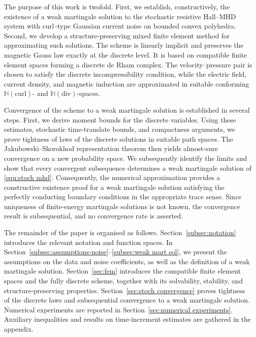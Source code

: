 \documentclass[11pt, reqno]{amsart}
\theoremstyle{definition}
\numberwithin{equation}{section}
\newcommand{\curl}{\mathrm{curl}\,}
\newcommand{\hdiv}{\mathbb{H}(\mathrm{div})}
\newcommand{\hcurl}{\mathbb{H}(\mathrm{curl})}
\begin{document}
The purpose of this work is twofold. First, we establish, constructively, the existence of a weak martingale solution to the stochastic resistive Hall--MHD system with $\curl$-type Gaussian current noise on bounded convex polyhedra. Second, we develop a structure-preserving mixed finite element method for approximating such solutions. The scheme is linearly implicit and preserves the magnetic Gauss law exactly at the discrete level. It is based on compatible finite element spaces forming a discrete de Rham complex. The velocity--pressure pair is chosen to satisfy the discrete incompressibility condition, while the electric field, current density, and magnetic induction are approximated in suitable conforming $\hcurl$- and $\hdiv$-spaces.

Convergence of the scheme to a weak martingale solution is established in several steps. First, we derive moment bounds for the discrete variables. Using these estimates, stochastic time-translate bounds, and compactness arguments, we prove tightness of laws of the discrete solutions in suitable path spaces. The Jakubowski--Skorokhod representation theorem then yields almost-sure convergence on a new probability space. We subsequently identify the limits and show that every convergent subsequence determines a weak martingale solution of \eqref{equ:stoch mhd}. Consequently, the numerical approximation provides a constructive existence proof for a weak martingale solution satisfying the perfectly conducting boundary conditions in the appropriate trace sense. Since uniqueness of finite-energy martingale solutions is not known, the convergence result is subsequential, and no convergence rate is asserted.

The remainder of the paper is organised as follows. Section~\ref{subsec:notation} introduces the relevant notation and function spaces. In Section~\ref{subsec:assumptions-noise}--\ref{subsec:weak mart sol}, we present the assumptions on the data and noise coefficients, as well as the definition of a weak martingale solution. Section~\ref{sec:fem} introduces the compatible finite element spaces and the fully discrete scheme, together with its solvability, stability, and structure-preserving properties. Section~\ref{sec:stoch convergence} proves tightness of the discrete laws and subsequential convergence to a weak martingale solution. Numerical experiments are reported in Section~\ref{sec:numerical experiments}. Auxiliary inequalities and results on time-increment estimates are gathered in the appendix.
\end{document}
